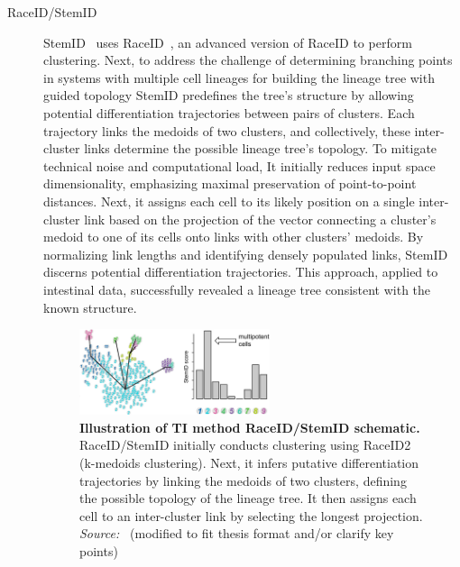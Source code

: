 \begin{description}
    \item[RaceID/StemID]
    StemID~\citep{grun2016stemid} uses RaceID~\citep{grun2015raceid}, an advanced version of RaceID to perform clustering. Next, to address the challenge of determining branching points in systems with multiple cell lineages for building the lineage tree with guided topology StemID predefines the tree's structure by allowing potential differentiation trajectories between pairs of clusters. Each trajectory links the medoids of two clusters, and collectively, these inter-cluster links determine the possible lineage tree's topology. To mitigate technical noise and computational load, It initially reduces input space dimensionality, emphasizing maximal preservation of point-to-point distances. Next, it assigns each cell to its likely position on a single inter-cluster link based on the projection of the vector connecting a cluster's medoid to one of its cells onto links with other clusters' medoids. By normalizing link lengths and identifying densely populated links, StemID discerns potential differentiation trajectories. This approach, applied to intestinal data, successfully revealed a lineage tree consistent with the known structure.
    \begin{figure}[ht!]
    	\centering
    	\includegraphics[width=0.55\textwidth]{TI_Alg_StemID/fig}
    	\vspace{0.1cm}
    	\caption[Illustration of TI method RaceID/StemID schematic.]{\textbf{Illustration of TI method RaceID/StemID schematic.}
    	RaceID/StemID initially conducts clustering using RaceID2 (k-medoids clustering). Next, it infers putative differentiation trajectories by linking the medoids of two clusters, defining the possible topology of the lineage tree. It then assigns each cell to an inter-cluster link by selecting the longest projection. \emph{Source:~\cite{albergante2020ElPiGraph}} (modified to fit thesis format and/or clarify key points)
    	}
    	\label{fig:TI_Alg_StemID}
    \end{figure}



\end{description}
